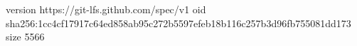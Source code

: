 version https://git-lfs.github.com/spec/v1
oid sha256:1cc4cf17917c64ed858ab95c272b5597efeb18b116c257b3d96fb755081dd173
size 5566

